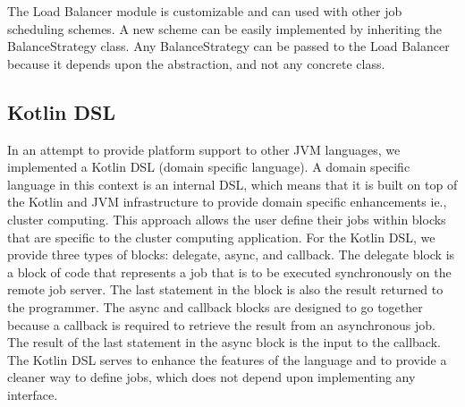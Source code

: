 The Load Balancer module is customizable and can used with other
job scheduling schemes.
A new scheme can be easily implemented by inheriting the BalanceStrategy
class.
Any BalanceStrategy can be passed to the Load Balancer because it depends upon
the abstraction, and not any concrete class.

\subsection{Kotlin DSL}\label{subsec:kotlinDsl}

In an attempt to provide platform support to other JVM languages, we
implemented a Kotlin DSL (domain specific language).
A domain specific language in this context is an internal DSL, which
means that it is built on top of the Kotlin and JVM infrastructure
to provide domain specific enhancements ie., cluster computing.
This approach allows the user define their jobs within blocks
that are specific to the cluster computing application.
For the Kotlin DSL, we provide three types of blocks:
delegate, async, and callback.
The delegate block is a block of code that represents a job
that is to be executed synchronously on the remote job server.
The last statement in the block is also the result returned to the
programmer.
The async and callback blocks are designed to go together because
a callback is required to retrieve the result from an asynchronous
job.
The result of the last statement in the async block is the input
to the callback.
The Kotlin DSL serves to enhance the features of the language and to
provide a cleaner way to define jobs, which does not depend upon
implementing any interface.

